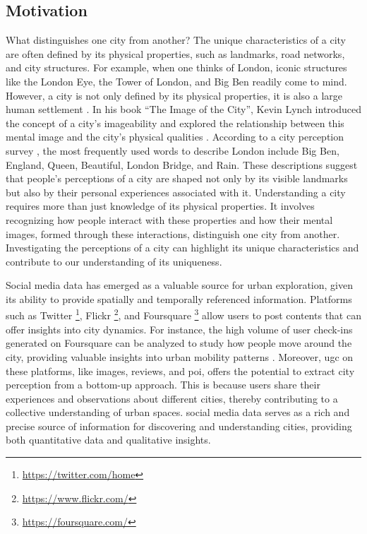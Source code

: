 \documentclass{article}
\theoremstyle{remark}
\begin{document}
\subsection{Motivation}
What distinguishes one city from another? The unique characteristics of a city are often defined by its physical properties, such as landmarks, road networks, and city structures. For example, when one thinks of London, iconic structures like the London Eye, the Tower of London, and Big Ben readily come to mind. However, a city is not only defined by its physical properties, it is also a large human settlement \citep{goodall_penguin_1987,kuper_social_2013}. In his book “The Image of the City”, Kevin Lynch introduced the concept of a city's imageability and explored the relationship between this mental image and the city's physical qualities \citep{lynch_image_1960}. According to a city perception survey \citep{institute_for_urban_strategies_city_2022}, the most frequently used words to describe London include Big Ben, England, Queen, Beautiful, London Bridge, and Rain. These descriptions suggest that people's perceptions of a city are shaped not only by its visible landmarks but also by their personal experiences associated with it. Understanding a city requires more than just knowledge of its physical properties. It involves recognizing how people interact with these properties and how their mental images, formed through these interactions, distinguish one city from another. Investigating the perceptions of a city can highlight its unique characteristics and contribute to our understanding of its uniqueness.

Social media data has emerged as a valuable source for urban exploration, given its ability to provide spatially and temporally referenced information. Platforms such as Twitter \footnote{\url{https://twitter.com/home}}, Flickr \footnote{\url{https://www.flickr.com/}}, and Foursquare \footnote{\url{https://foursquare.com/}} allow users to post contents that can offer insights into city dynamics. For instance, the high volume of user check-ins generated on Foursquare can be analyzed to study
how people move around the city, providing valuable insights into
urban mobility patterns \citep{ferreira_beyond_2015}. Moreover, \acrfull{ugc} on these platforms, like images, reviews, and \acrfull{poi}, offers the potential to extract city perception from a bottom-up approach. This is because users share their experiences and observations about different cities, thereby contributing to a collective understanding of urban spaces. social media data serves as a rich and precise source of information for discovering and understanding cities, providing both quantitative data and qualitative insights.
\end{document}
